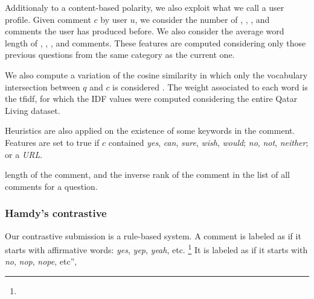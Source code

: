 Additionaly to a content-based polarity, we also exploit what we call a user 
profile. Given comment $c$ by user $u$, we consider the number of 
\good, \bad, \pot, and \dial comments the user has produced before. We also 
consider the average word length of \good, \bad, \pot, and \dial comments.
These features are computed considering only those previous questions from 
the same category as the current one. 

We also compute a variation of the cosine similarity in which only the 
vocabulary intersection between $q$ and $c$ is considered . The 
weight associated to each word is the tfidf, for which the IDF values were 
computed considering the entire Qatar Living dataset.


Heuristics are also applied on the existence of some keywords in the comment. 
Features are set to true if $c$ contained
\Ni \textit{yes}, \textit{can}, \textit{sure}, \textit{wish}, \textit{would};
\Nii \textit{no}, \textit{not}, \textit{neither}; or 
\Niii  a \textit{URL}.





length of the comment, and the inverse rank of the comment in the list of all 
comments for a question.




\subsubsection{Hamdy's contrastive}

Our contrastive submission  is a rule-based system. A comment is 
labeled as \yes if it starts with affirmative words: \textit{yes}, 
\textit{yep}, \textit{yeah}, etc.%
\footnote{}
It is labeled as \no if it starts with \textit{no}, \textit{nop}, 
\textit{nope}, etc”, 

